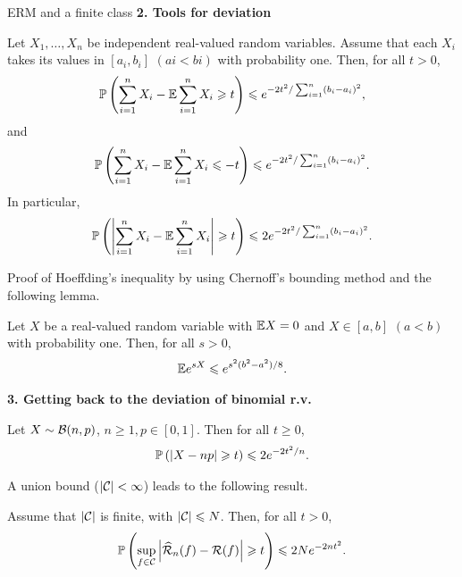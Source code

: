 \documentclass[xcolor={usenames,dvipsnames},handout]{beamer}
\begin{document}
\begin{frame}{ERM and a finite class}
\textbf{2. Tools for deviation} 
\begin{theorem} 
{\small
Let $X_1, \hdots , X_n$ be independent real-valued random variables. Assume that each $X_i$ takes its values in $[a_i , b_i ]$ $(ai < bi )$ with probability one. Then, for all $t > 0$,
$$
\P \left( \sum_{i=1}^n X_i - \E \sum_{i=1}^n X_i  \geq t \right) \leq e^{-2t^2 / \sum_{i=1}^n (b_i -a_i)^2},
$$
and 
$$
\P \left( \sum_{i=1}^n X_i - \E \sum_{i=1}^n X_i  \leq -t \right) \leq e^{-2t^2 / \sum_{i=1}^n (b_i -a_i)^2}.
$$
In particular,
$$ 
\P \left( \left|  \sum_{i=1}^n X_i - \E \sum_{i=1}^n X_i  \right| \geq t \right)  \leq 2 e^{-2t^2 / \sum_{i=1}^n (b_i -a_i)^2}.
$$}
\end{theorem}
\end{frame}
\begin{frame}
Proof of Hoeffding's inequality by using Chernoff's bounding method and the following lemma.
\begin{lemma}\label{lem:for_hoeffding}
Let $X$ be a real-valued random variable with $\E X = 0$ and $X\in [ a, b ]$ $(a < b)$ with probability one. Then, for all $s > 0$,
$$
\E e^{sX} \leq e^{s^2(b^2-a^2)/8}.
$$
\end{lemma}

\vspace{.3cm}

\end{frame}

\begin{frame}
 \textbf{3. Getting back to the deviation of binomial r.v.\ }
{\small
\begin{corollary}
Let $X \sim \Bc(n,p)$, $n \geq 1, p \in [0,1]$. Then for all $t\geq 0$,
$$
\P \left( \left| X- np \right| \geq t \right) \leq 2 e^{-2t^2/n}.
$$
\end{corollary}}
A union bound ($|\Cc|<\infty$) leads to the following result.
\begin{theorem}
\label{thm:C_finie}
Assume that $|\Cc| $ is finite, with $|\Cc| \leq N$. Then, for all $t > 0$,
$$
\P \left( \sup_{f\in \Cc} \left| \widehat{\Rc}_n(f) - \Rc(f)  \right| \geq t  \right) \leq 2N e^{-2nt^2}.
$$
\end{theorem}
\end{frame}
\end{document}
